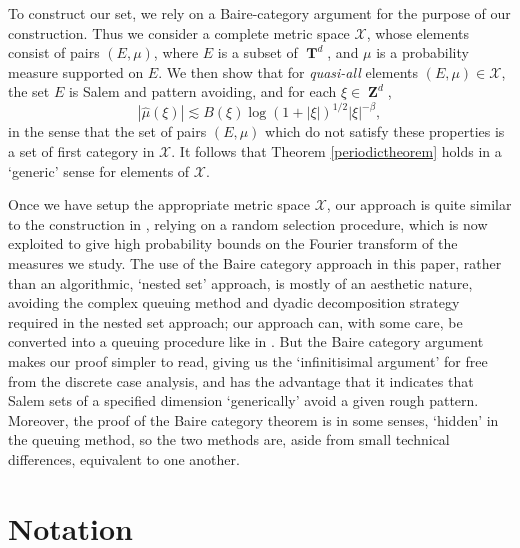 \documentclass[12pt,reqno]{article}
\numberwithin{equation}{section}
\DeclareMathOperator{\ZZ}{\mathbf{Z}}
\DeclareMathOperator{\TT}{\mathbf{T}}
\begin{document}
To construct our set, we rely on a Baire-category argument for the purpose of our construction. Thus we consider a complete metric space $\mathcal{X}$, whose elements consist of pairs $(E,\mu)$, where $E$ is a subset of $\TT^d$, and $\mu$ is a probability measure supported on $E$. We then show that for \emph{quasi-all} elements $(E,\mu) \in \mathcal{X}$, the set $E$ is Salem and pattern avoiding, and for each $\xi \in \ZZ^d$,
%
\[ |\widehat{\mu}(\xi)| \lesssim B(\xi) \log(1 + |\xi|)^{1/2} |\xi|^{-\beta}, \]
%
in the sense that the set of pairs $(E,\mu)$ which do not satisfy these properties is a set of first category in $\mathcal{X}$. It follows that Theorem \ref{periodictheorem} holds in a `generic' sense for elements of $\mathcal{X}$.

Once we have setup the appropriate metric space $\mathcal{X}$, our approach is quite similar to the construction in \cite{OurPaper}, relying on a random selection procedure, which is now exploited to give high probability bounds on the Fourier transform of the measures we study. The use of the Baire category approach in this paper, rather than an algorithmic, `nested set' approach, is mostly of an aesthetic nature, avoiding the complex queuing method and dyadic decomposition strategy required in the nested set approach; our approach can, with some care, be converted into a queuing procedure like in \cite{OurPaper}. But the Baire category argument makes our proof simpler to read, giving us the `infinitisimal argument' for free from the discrete case analysis, and has the advantage that it indicates that Salem sets of a specified dimension `generically' avoid a given rough pattern. Moreover, the proof of the Baire category theorem is in some senses, `hidden' in the queuing method, so the two methods are, aside from small technical differences, equivalent to one another.

\section{Notation} \label{notationSection}
\end{document}
